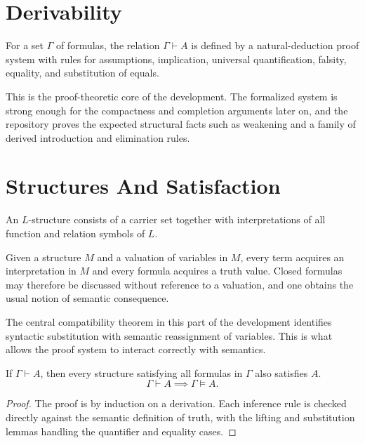 \section{Derivability}

\begin{definition}[Derivability]
\label{def:fol-derivability}
For a set $\Gamma$ of formulas, the relation $\Gamma \vdash A$ is defined by a
natural-deduction proof system with rules for assumptions, implication,
universal quantification, falsity, equality, and substitution of equals.
\end{definition}

This is the proof-theoretic core of the development. The formalized system is
strong enough for the compactness and completion arguments later on, and the
repository proves the expected structural facts such as weakening and a family
of derived introduction and elimination rules.

\section{Structures And Satisfaction}

\begin{definition}[Structure]
\label{def:fol-structure}
An $L$-structure consists of a carrier set together with interpretations of all
function and relation symbols of $L$.
\end{definition}

Given a structure $M$ and a valuation of variables in $M$, every term acquires
an interpretation in $M$ and every formula acquires a truth value. Closed
formulas may therefore be discussed without reference to a valuation, and one
obtains the usual notion of semantic consequence.

The central compatibility theorem in this part of the development identifies
syntactic substitution with semantic reassignment of variables. This is what
allows the proof system to interact correctly with semantics.

\begin{proposition}[Soundness]
\label{prop:formula-soundness}
If $\Gamma \vdash A$, then every structure satisfying all formulas in $\Gamma$
also satisfies $A$.
\[
\Gamma \vdash A \implies \Gamma \models A.
\]
\end{proposition}

\begin{proof}
The proof is by induction on a derivation. Each inference rule is checked
directly against the semantic definition of truth, with the lifting and
substitution lemmas handling the quantifier and equality cases.
\end{proof}

